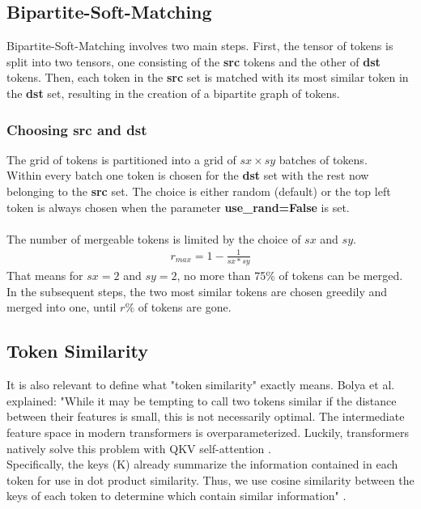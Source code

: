\subsection{Bipartite-Soft-Matching}
Bipartite-Soft-Matching involves two main steps. First, the tensor of tokens is split into two tensors, one consisting of the \textbf{src} tokens and the other of \textbf{dst} tokens. Then, each token in the \textbf{src} set is matched with its most similar token in the \textbf{dst} set, resulting in the creation of a bipartite graph of tokens. 



\subsubsection*{Choosing src and dst}
The grid of tokens is partitioned into a grid of \(sx \times sy\) batches of tokens.\\
Within every batch one token is chosen for the \textbf{dst} set with the rest now belonging to the \textbf{src} set. The choice is either random (default) or the top left token is always chosen when the parameter \textbf{use\_rand=False} is set.\\
\\
The number of mergeable tokens is limited by the choice of \(sx\) and \(sy\).
\begin{align*}
    r_{max} = 1-\frac{1}{sx*sy}
\end{align*}
That means for \(sx = 2\) and \(sy = 2\), no more than 75\% of tokens can be merged.\\
In the subsequent steps, the two most similar tokens are chosen greedily and merged into one, until \(r\%\) of tokens are gone.



\subsection{Token Similarity}
It is also relevant to define what "token similarity" exactly means. Bolya et al. explained: "While it may be tempting to call two tokens similar if the distance between their features is small, this is not necessarily optimal. The intermediate feature space in modern transformers is overparameterized. Luckily, transformers natively solve this problem with QKV self-attention \cite{vaswani2017attention}.\\
Specifically, the keys (K) already summarize the information contained in each token for use in dot product similarity. Thus, we use cosine similarity between the keys of each token to determine which contain similar information" \cite{bolya2023tome}.





